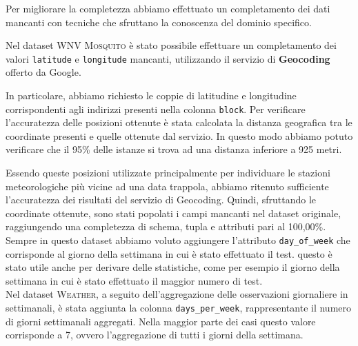 Per migliorare la completezza abbiamo effettuato un completamento dei dati 
mancanti con tecniche che sfruttano la conoscenza del dominio specifico.

Nel dataset \textsc{WNV Mosquito} è stato possibile effettuare un completamento 
dei valori \texttt{latitude} e \texttt{longitude} mancanti, utilizzando il 
servizio di \textbf{Geocoding} offerto da Google.

In particolare, abbiamo richiesto le coppie di latitudine e longitudine 
corrispondenti agli indirizzi presenti nella colonna \texttt{block}. Per 
verificare l'accuratezza delle posizioni ottenute è stata calcolata la distanza 
geografica tra le coordinate presenti e quelle ottenute dal servizio. In questo 
modo abbiamo potuto verificare che il 95\% delle istanze si trova ad una 
distanza inferiore a 925 metri.

Essendo queste posizioni utilizzate principalmente per individuare le stazioni 
meteorologiche più vicine ad una data trappola, abbiamo ritenuto sufficiente 
l'accuratezza dei risultati del servizio di Geocoding. Quindi, sfruttando 
le coordinate ottenute, sono stati popolati i campi mancanti nel dataset 
originale, raggiungendo una completezza di schema, tupla e attributi pari al 
100,00\%.
\\
Sempre in questo dataset abbiamo voluto aggiungere l'attributo 
\texttt{day\_of\_week} che corrisponde al giorno della settimana in cui è stato 
effettuato il test. questo è stato utile anche per derivare delle statistiche, 
come per esempio il giorno della settimana in cui è stato effettuato il maggior 
numero di test. 
\\

Nel dataset \textsc{Weather}, a seguito dell'aggregazione delle osservazioni 
giornaliere in settimanali, è stata aggiunta la colonna 
\texttt{days\_per\_week}, rappresentante il numero di giorni settimanali 
aggregati. Nella maggior parte dei casi questo valore corrisponde a 7, ovvero 
l'aggregazione di tutti i giorni della settimana.


